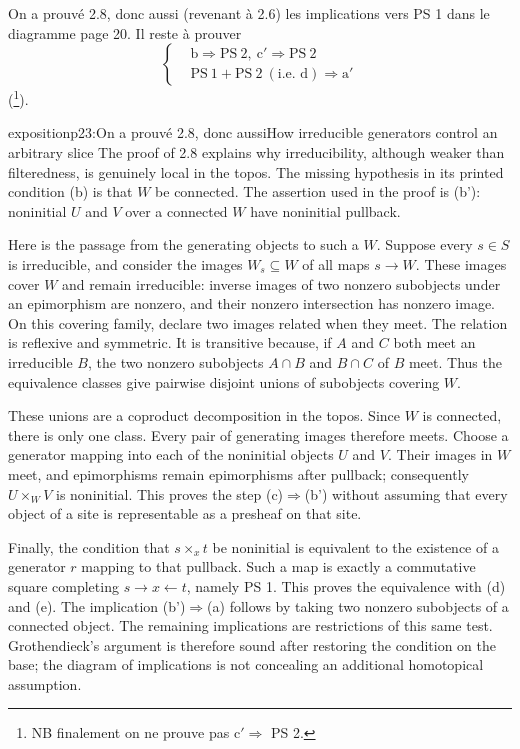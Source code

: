 On a prouvé 2.8, donc aussi (revenant à 2.6) les implications vers PS 1 dans le diagramme page 20. Il reste à prouver
\[
\left\{
\begin{aligned}
&\mathrm{b}\Longrightarrow\mathrm{PS}\ 2,\ \mathrm{c}'\Longrightarrow\mathrm{PS}\ 2\\
&\mathrm{PS}\ 1+\mathrm{PS}\ 2\ (\text{i.e. d})\Longrightarrow\mathrm{a}'
\end{aligned}
\right.
\]
(\footnote[32]{NB finalement on ne prouve pas c$'\Longrightarrow$ PS 2.}).

\begin{dcomment}{exposition}{p23:On a prouvé 2.8, donc aussi}{How irreducible generators control an arbitrary slice}
The proof of 2.8 explains why irreducibility, although weaker than filteredness, is genuinely local in the topos. The missing hypothesis in its printed condition (b) is that $W$ be connected. The assertion used in the proof is (b'): noninitial $U$ and $V$ over a connected $W$ have noninitial pullback.

Here is the passage from the generating objects to such a $W$. Suppose every $s\in S$ is irreducible, and consider the images $W_s\subseteq W$ of all maps $s\to W$. These images cover $W$ and remain irreducible: inverse images of two nonzero subobjects under an epimorphism are nonzero, and their nonzero intersection has nonzero image. On this covering family, declare two images related when they meet. The relation is reflexive and symmetric. It is transitive because, if $A$ and $C$ both meet an irreducible $B$, the two nonzero subobjects $A\cap B$ and $B\cap C$ of $B$ meet. Thus the equivalence classes give pairwise disjoint unions of subobjects covering $W$.

These unions are a coproduct decomposition in the topos. Since $W$ is connected, there is only one class. Every pair of generating images therefore meets. Choose a generator mapping into each of the noninitial objects $U$ and $V$. Their images in $W$ meet, and epimorphisms remain epimorphisms after pullback; consequently $U\times_WV$ is noninitial. This proves the step (c)$\Rightarrow$(b') without assuming that every object of a site is representable as a presheaf on that site.

Finally, the condition that $s\times_x t$ be noninitial is equivalent to the existence of a generator $r$ mapping to that pullback. Such a map is exactly a commutative square completing $s\to x\leftarrow t$, namely PS 1. This proves the equivalence with (d) and (e). The implication (b')$\Rightarrow$(a) follows by taking two nonzero subobjects of a connected object. The remaining implications are restrictions of this same test. Grothendieck's argument is therefore sound after restoring the condition on the base; the diagram of implications is not concealing an additional homotopical assumption.
\end{dcomment}


